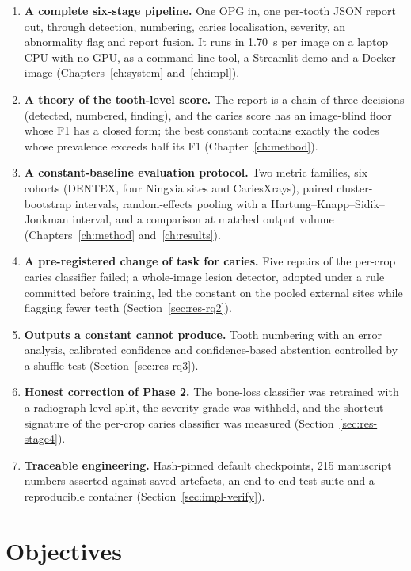 \begin{enumerate}[label=\arabic*.,leftmargin=1.6em]
\item \textbf{A complete six-stage pipeline.} One OPG in, one per-tooth JSON report out, through
  detection, numbering, caries localisation, severity, an abnormality flag and report fusion. It runs
  in 1.70~s per image on a laptop CPU with no GPU, as a command-line tool, a Streamlit demo and a
  Docker image (Chapters~\ref{ch:system} and~\ref{ch:impl}). %
\item \textbf{A theory of the tooth-level score.} The report is a chain of three decisions
  (detected, numbered, finding), and the caries score has an image-blind floor whose F1 has a
  closed form; the best constant contains exactly the codes whose prevalence exceeds half its F1
  (Chapter~\ref{ch:method}). %
\item \textbf{A constant-baseline evaluation protocol.} Two metric families, six cohorts (DENTEX, four
  Ningxia sites and CariesXrays), paired cluster-bootstrap intervals, random-effects pooling with a
  Hartung--Knapp--Sidik--Jonkman interval, and a comparison at matched output volume
  (Chapters~\ref{ch:method} and~\ref{ch:results}).
\item \textbf{A pre-registered change of task for caries.} Five repairs of the per-crop caries
  classifier failed; a whole-image lesion detector, adopted under a rule committed before training,
  led the constant on the pooled external sites while flagging fewer teeth (Section~\ref{sec:res-rq2}). %
\item \textbf{Outputs a constant cannot produce.} Tooth numbering with an error analysis, calibrated
  confidence and confidence-based abstention controlled by a shuffle test (Section~\ref{sec:res-rq3}). %
\item \textbf{Honest correction of Phase 2.} The bone-loss classifier was retrained with a
  radiograph-level split, the severity grade was withheld, and the shortcut signature of the
  per-crop caries classifier was measured (Section~\ref{sec:res-stage4}). %
\item \textbf{Traceable engineering.} Hash-pinned default checkpoints, 215 manuscript numbers asserted
  against saved artefacts, an end-to-end test suite and a reproducible container
  (Section~\ref{sec:impl-verify}). %
\end{enumerate}

\section{Objectives}

